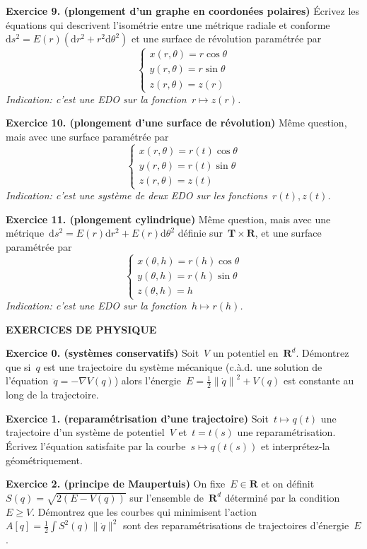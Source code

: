 \documentclass[a4paper,11pt]{article}
\def\ud{\mathrm{d}}
\def\R{\mathbf{R}}
\begin{document}
{\bf Exercice 9. (plongement d'un graphe en coordonées polaires)}
Écrivez les équations qui descrivent l'isométrie entre une métrique
radiale et conforme~$\ud s^2 = E(r)\left(\ud r^2+r^2\ud\theta^2\right)$ et une
surface de révolution paramétrée par
\[
	\begin{cases}
		x(r,\theta)=r\cos\theta\\
		y(r,\theta)=r\sin\theta\\
		z(r,\theta)=z(r)
	\end{cases}
\]
{\sl Indication: c'est une EDO sur la fonction~$r\mapsto z(r)$.}

{\bf Exercice 10. (plongement d'une surface de révolution)}
Même question, mais avec une surface paramétrée par
\[
	\begin{cases}
		x(r,\theta)=r(t)\cos\theta\\
		y(r,\theta)=r(t)\sin\theta\\
		z(r,\theta)=z(t)
	\end{cases}
\]
{\sl Indication: c'est une système de deux EDO sur les fonctions~$r(t),z(t)$.}

{\bf Exercice 11. (plongement cylindrique)}
Même question, mais avec une métrique~$\ud s^2=E(r)\ud r^2+E(r)\ud \theta^2$ définie
sur~$\mathbf{T}\times\R$, et une surface paramétrée par
\[
	\begin{cases}
		x(\theta,h)=r(h)\cos\theta\\
		y(\theta,h)=r(h)\sin\theta\\
		z(\theta,h)=h
	\end{cases}
\]
{\sl Indication: c'est une EDO sur la fonction~$h\mapsto r(h)$.}

\clearpage

{\bf EXERCICES DE PHYSIQUE }

{\bf Exercice 0. (systèmes conservatifs)}
Soit~$V$ un potentiel en~$\R^d$.  Démontrez que si~$q$ est une trajectoire du
système mécanique (c.à.d. une solution de l'équation~$\ddot q=-\nabla V(q)$)
alors l'énergie~$E=\tfrac12\left\|\dot q\right\|^2+V(q)$ est constante au long
de la trajectoire.

{\bf Exercice 1. (reparamétrisation d'une trajectoire)}
Soit~$t\mapsto q(t)$ une trajectoire d'un système de potentiel~$V$ et~$t=t(s)$
une reparamétrisation.  Écrivez l'équation satisfaite par la courbe~$s\mapsto
q(t(s))$ et interprétez-la géométriquement.

{\bf Exercice 2. (principe de Maupertuis)}
On fixe~$E\in\R$ et on définit~$S(q)=\sqrt{2(E-V(q))}$ sur l'ensemble de~$\R^d$
déterminé par la condition~$E\ge V$.  Démontrez que les courbes qui minimisent
l'action~$A[q]=\tfrac12\int S^2(q)\|\dot q\|^2$ sont des reparamétrisations de trajectoires
d'énergie~$E$.
\end{document}
